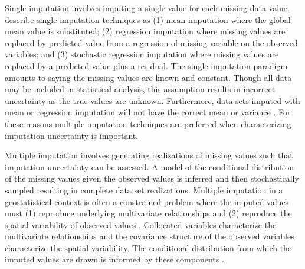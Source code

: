 Single imputation involves imputing a single value for each missing data value. \cite{little2019statistical} describe single imputation techniques as (1) mean imputation where the global mean value is substituted; (2) regression imputation where missing values are replaced by predicted value from a regression of missing variable on the observed variables; and (3) stochastic regression imputation where missing values are replaced by a predicted value plus a residual. The single imputation paradigm amounts to saying the missing values are known and constant. Though all data may be included in statistical analysis, this assumption results in incorrect uncertainty as the true values are unknown. Furthermore, data sets imputed with mean or regression imputation will not have the correct mean or variance \citep{barnett2015multivariate}. For these reasons multiple imputation techniques are preferred when characterizing imputation uncertainty is important.

Multiple imputation involves generating realizations of missing values such that imputation uncertainty can be assessed. A model of the conditional distribution of the missing values given the observed values is inferred and then stochastically sampled resulting in complete data set realizations. Multiple imputation in a geostatistical context is often a constrained problem where the imputed values must (1) reproduce underlying multivariate relationships and (2) reproduce the spatial variability of observed values \citep{barnett2015multivariate}. Collocated variables characterize the multivariate relationships and the covariance structure of the observed variables characterize the spatial variability. The conditional distribution from which the imputed values are drawn is informed by these components \citep{hadavand2023spatial}.

